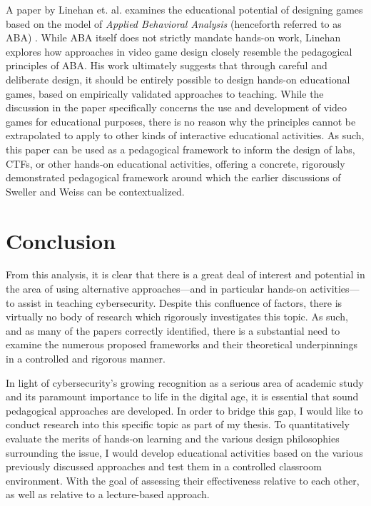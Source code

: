     A paper by Linehan et. al. examines the educational potential of designing games based on the model of \emph{Applied Behavioral Analysis} (henceforth referred to as ABA) \cite{C-Linehan}. While ABA itself does not strictly mandate hands-on work, Linehan explores how approaches in video game design closely resemble the pedagogical principles of ABA. His work ultimately suggests that through careful and deliberate design, it should be entirely possible to design hands-on educational games, based on empirically validated approaches to teaching. While the discussion in the paper specifically concerns the use and development of video games for educational purposes, there is no reason why the principles cannot be extrapolated to apply to other kinds of interactive educational activities. As such, this paper can be used as a pedagogical framework to inform the design of labs, CTFs, or other hands-on educational activities, offering a concrete, rigorously demonstrated pedagogical framework around which the earlier discussions of Sweller and Weiss can be contextualized. 

\section{Conclusion}

    From this analysis, it is clear that there is a great deal of interest and potential in the area of using alternative approaches---and in particular hands-on activities---to assist in teaching cybersecurity. Despite this confluence of factors, there is virtually no body of research which rigorously investigates this topic. As such, and as many of the papers correctly identified, there is a substantial need to examine the numerous proposed frameworks and their theoretical underpinnings in a controlled and rigorous manner. 

    In light of cybersecurity's growing recognition as a serious area of academic study and its paramount importance to life in the digital age, it is essential that sound pedagogical approaches are developed. In order to bridge this gap, I would like to conduct research into this specific topic as part of my thesis. To quantitatively evaluate the merits of hands-on learning and the various design philosophies surrounding the issue, I would develop educational activities based on the various previously discussed approaches and test them in a controlled classroom environment. With the goal of assessing their effectiveness relative to each other, as well as relative to a lecture-based approach. 